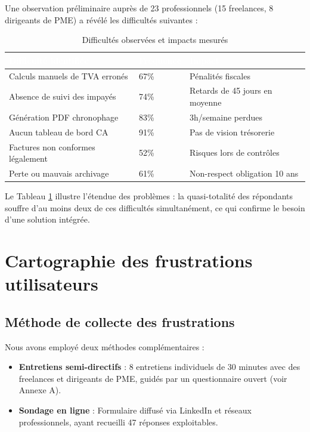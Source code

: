 \documentclass[12pt,a4paper]{report}
\begin{document}
Une observation préliminaire auprès de 23 professionnels (15 freelances, 8 dirigeants de PME) a révélé les difficultés suivantes :

\begin{table}[H]
\centering
\caption{Difficultés observées et impacts mesurés}
\label{tab:difficultes}
\begin{tabularx}{\textwidth}{|X|l|l|}
\hline
\rowcolor{emsiblue}\textcolor{white}{\textbf{Difficulté identifiée}} & \textcolor{white}{\textbf{Fréquence}} & \textcolor{white}{\textbf{Impact}} \\
\hline
Calculs manuels de TVA erronés & 67\% & Pénalités fiscales \\
Absence de suivi des impayés & 74\% & Retards de 45 jours en moyenne \\
Génération PDF chronophage & 83\% & 3h/semaine perdues \\
Aucun tableau de bord CA & 91\% & Pas de vision trésorerie \\
Factures non conformes légalement & 52\% & Risques lors de contrôles \\
Perte ou mauvais archivage & 61\% & Non-respect obligation 10 ans \\
\hline
\end{tabularx}
\end{table}

Le Tableau \ref{tab:difficultes} illustre l'étendue des problèmes : la quasi-totalité des répondants souffre d'au moins deux de ces difficultés simultanément, ce qui confirme le besoin d'une solution intégrée.

\section{Cartographie des frustrations utilisateurs}

\subsection{Méthode de collecte des frustrations}

Nous avons employé deux méthodes complémentaires :
\begin{itemize}
    \item \textbf{Entretiens semi-directifs} : 8 entretiens individuels de 30 minutes avec des freelances et dirigeants de PME, guidés par un questionnaire ouvert (voir Annexe A).
    \item \textbf{Sondage en ligne} : Formulaire diffusé via LinkedIn et réseaux professionnels, ayant recueilli 47 réponses exploitables.
\end{itemize}
\end{document}
